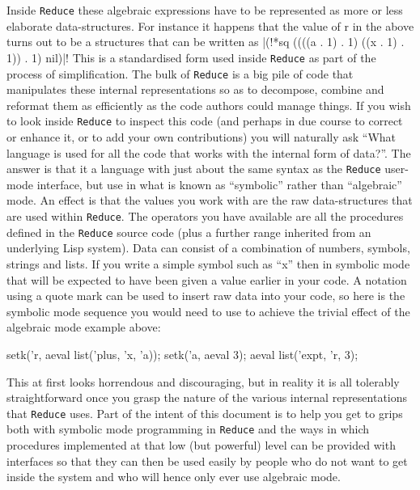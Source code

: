\documentclass[12pt,twoside,openright]{memoir}
\newcommand{\reduce}{\texttt{Reduce}\xspace}
\begin{document}
Inside \reduce these algebraic expressions have to be represented as
more or less elaborate data-structures. For instance it happens that the
value of r in the above turns out to be a structures that can be
written as |(!*sq ((((a . 1) . 1) ((x . 1) . 1)) . 1) nil)|! This is a
standardised form used inside \reduce as part of the process of simplification.
The bulk of \reduce is a big pile of code that manipulates these
internal representations so as to decompose, combine and reformat them
as efficiently as the code authors could manage things. If you wish to
look inside \reduce to inspect this code (and perhaps in due course to
correct or enhance it, or to add your own contributions) you will
naturally ask ``What language is used for all the code that works with
the internal form of data?''. The answer is that it a language with
just about the same syntax as the \reduce user-mode interface, but
use in what is known as ``symbolic'' rather than ``algebraic'' mode. An
effect is that the values you work with are the raw data-structures that
are used within \reduce. The operators you have available are all the
procedures defined in the \reduce source code (plus a further range
inherited from an underlying Lisp system). Data can consist of a
combination of numbers, symbols, strings and lists. If you write a simple
symbol such as ``x'' then in symbolic mode that will be expected to have been
given a value earlier in your code. A notation using a quote mark can be
used to insert raw data into your code, so here is the symbolic mode
sequence you would need to use to achieve the trivial effect of the
algebraic mode example above:
\begin{rlispverb}
setk('r, aeval list('plus, 'x, 'a));
setk('a, aeval 3);
aeval list('expt, 'r, 3);
\end{rlispverb}
This at first looks horrendous and discouraging, but in reality it is
all tolerably straightforward once you grasp the nature of the various
internal representations that \reduce uses. Part of the intent of this
document is to help you get to grips both with symbolic mode programming
in \reduce and the ways in which procedures implemented at that low (but
powerful) level can be provided with interfaces so that they can then be
used easily by people who do not want to get inside the system and who will
hence only ever use algebraic mode.
\end{document}
